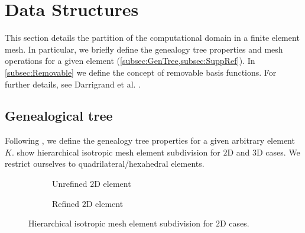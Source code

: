
\section{Data Structures}
\label{sec:DataStruct}
This section details the partition of the computational domain in a finite element mesh. In particular, we briefly define the genealogy tree properties and mesh operations for a given element (\cref{subsec:GenTree,subsec:SuppRef}). In \cref{subsec:Removable} we define the concept of removable basis functions. For further details, see Darrigrand et al. \cite{darrigrand2020painless}.

\subsection{Genealogical tree}
\label{subsec:GenTree}
Following \cite{zander2015multi,zander2016multi,zander2017multi}, we define the genealogy tree properties for a given arbitrary element $K$.  show hierarchical isotropic mesh element subdivision for $2$D and $3$D cases. We restrict ourselves to quadrilateral/hexahedral elements.

\begin{figure}
  \begin{subfigure}[]{0.45\textwidth}
    \begin{center}
      \centering
      \caption{Unrefined $2$D element}
      \label{subfig:unref2Delement}
    \end{center}
  \end{subfigure}
  \begin{subfigure}[]{0.45\textwidth}
    \begin{center}
      \centering
      \caption{Refined $2$D element}
      \label{subfig:ref2Delement}
    \end{center}
  \end{subfigure}
  \caption{Hierarchical isotropic mesh element subdivision for $2$D cases.}
  \label{fig:Hierarchi2D}
\end{figure}

